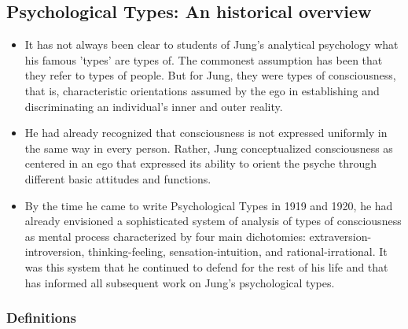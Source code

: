 \subsection{Psychological Types: An historical overview}

\begin{itemize}

\item It has not always been clear to students of Jung's analytical psychology
what his famous 'types' are types of. The commonest assumption has been that
they refer to types of people. But for Jung, they were types of consciousness,
that is, characteristic orientations assumed by the ego in establishing and
discriminating an individual's inner and outer reality.

\item He had already recognized that consciousness is not expressed uniformly
in the same way in every person. Rather, Jung conceptualized consciousness as
centered in an ego that expressed its ability to orient the psyche through
different basic attitudes and functions.

\item By the time he came to write Psychological Types in 1919 and 1920, he had
already envisioned a sophisticated system of analysis of types of consciousness
as mental process characterized by four main dichotomies:
extraversion-introversion, thinking-feeling, sensation-intuition, and
rational-irrational. It was this system that he continued to defend for the
rest of his life and that has informed all subsequent work on Jung's
psychological types.

\end{itemize}

\subsubsection{Definitions}

